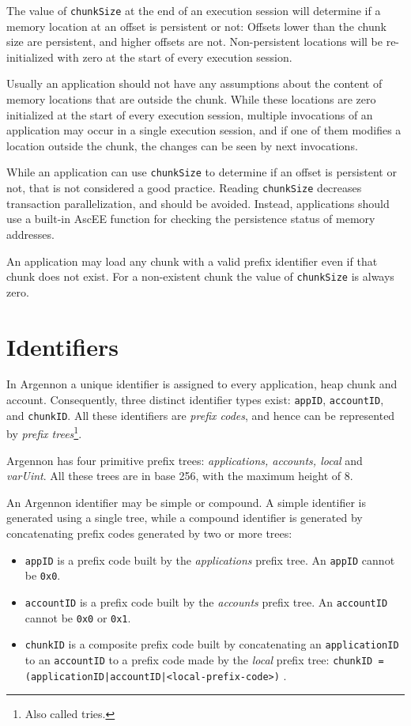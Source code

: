 The value of \texttt{chunkSize} at the end of an execution session will determine if a memory location at an
offset is persistent or not: Offsets lower than the chunk size are persistent, and higher offsets are not.
Non-persistent locations will be re-initialized with zero at the start of every execution session.

Usually an application should not have any assumptions about the content of memory locations that are outside the chunk.
While these locations are zero initialized at the start of every execution session, multiple
invocations of an application may occur in a single execution session, and if one of them modifies a location outside
the chunk, the changes can be seen by next invocations.

While an application can use \texttt{chunkSize} to determine if an offset is persistent or not, that is not
considered a good practice. Reading \texttt{chunkSize} decreases transaction parallelization, and should be avoided.
Instead, applications should use a built-in AscEE function for checking the persistence status of memory addresses.

An application may load any chunk with a valid prefix identifier even if that chunk does not exist. For a non-existent
chunk the value of \texttt{chunkSize} is always zero.


\section{Identifiers}\label{sec:identifiers}

In Argennon a unique identifier is assigned to every application, heap chunk and account. Consequently, three distinct
identifier types exist: \texttt{appID}, \texttt{accountID}, and \texttt{chunkID}.
All these identifiers are \emph{prefix codes}, and hence can be represented by
\emph{prefix trees}\footnote{Also called tries.}.

Argennon has four primitive prefix trees: \emph{applications, accounts, local} and \emph{varUint}. All these trees
are in base 256, with the maximum height of 8.

An Argennon identifier may be simple or compound. A simple identifier is generated using a single tree, while a
compound identifier is generated by concatenating prefix codes generated by two or more trees:

\begin{itemize}
    \item \texttt{appID} is a prefix code built by the \emph{applications} prefix tree. An \texttt{appID} cannot
    be \texttt{0x0}.

    \item \texttt{accountID} is a prefix code built by the \emph{accounts} prefix tree. An \texttt{accountID} cannot
    be \texttt{0x0} or \texttt{0x1}.

    \item \texttt{chunkID} is a composite prefix code built by concatenating an \texttt{applicationID} to
    an \texttt{accountID} to a prefix code made by the \emph{local} prefix tree:
    \subitem \texttt{chunkID = (applicationID|accountID|<local-prefix-code>)} .
\end{itemize}

